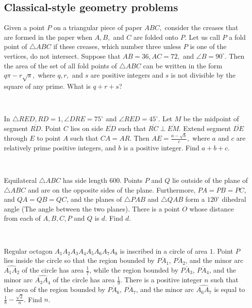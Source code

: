 \documentclass{article}
\begin{document}
\subsection{Classical-style geometry problems}
\begin{prob}[AIME 1994/15]{4}
Given a point $P$ on a triangular piece of paper $ABC,$ consider the creases that are formed in the paper when $A, B,$ and $C$ are folded onto $P.$ Let us call $P$ a fold point of $\triangle ABC$ if these creases, which number three unless $P$ is one of the vertices, do not intersect. Suppose that $AB=36, AC=72,$ and $\angle B=90^\circ.$ Then the area of the set of all fold points of $\triangle ABC$ can be written in the form $q\pi-r\sqrt{s},$ where $q, r,$ and $s$ are positive integers and $s$ is not divisible by the square of any prime. What is $q+r+s$?
\end{prob}\\
\begin{prob}[AIME I 2014/11]{6}
In $\triangle RED, RD =1, \angle DRE = 75^\circ$ and $\angle RED = 45^\circ$. Let $M$ be the midpoint of segment $\overline{RD}$. Point $C$ lies on side $\overline{ED}$ such that $\overline{RC} \perp \overline{EM}$. Extend segment $\overline{DE}$ through $E$ to point $A$ such that $CA = AR$. Then $AE = \tfrac{a-\sqrt{b}}{c},$ where $a$ and $c$ are relatively prime positive integers, and $b$ is a positive integer. Find $a+b+c$.	
\end{prob}\\
\begin{prob}[AIME II 2016/14]{6}
Equilateral $\triangle ABC$ has side length $600$. Points $P$ and $Q$ lie outside of the plane of $\triangle ABC$ and are on the opposite sides of the plane. Furthermore, $PA=PB=PC$, and $QA=QB=QC$, and the planes of $\triangle PAB$ and $\triangle QAB$ form a $120^{\circ}$ dihedral angle (The angle between the two planes). There is a point $O$ whose distance from each of $A,B,C,P$ and $Q$ is $d$. Find $d$.	
\end{prob}\\
\begin{prob}[AIME II 2019/13]{6}
Regular octagon $A_1A_2A_3A_4A_5A_6A_7A_8$ is inscribed in a circle of area $1$. Point $P$ lies inside the circle so that the region bounded by $\overline{PA_1}$, $\overline{PA_2}$, and the minor arc $\widehat{A_1A_2}$ of the circle has area $\tfrac17$, while the region bounded by $\overline{PA_3}$, $\overline{PA_4}$, and the minor arc $\widehat{A_3A_4}$ of the circle has area $\tfrac 19$. There is a positive integer $n$ such that the area of the region bounded by $\overline{PA_6}$, $\overline{PA_7}$, and the minor arc $\widehat{A_6A_7}$ is equal to $\tfrac18 - \tfrac{\sqrt 2}n$. Find $n$.
\end{prob}\\
\end{document}
